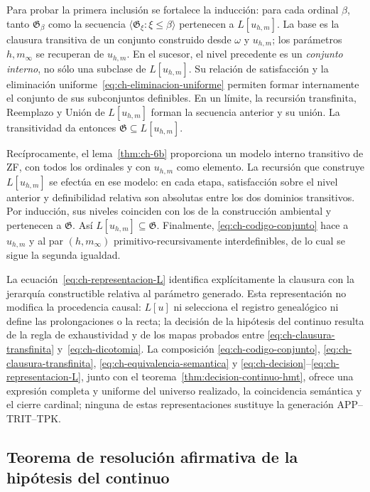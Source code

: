 Para probar la primera inclusión se fortalece la inducción: para cada
ordinal \(\beta\), tanto \(\mathfrak G_\beta\) como la secuencia
\(\langle\mathfrak G_\xi:\xi\leq\beta\rangle\) pertenecen a
\(L[u_{h,m}]\). La base es la clausura transitiva de un conjunto construido
desde \(\omega\) y \(u_{h,m}\); los parámetros \(h,m_\infty\) se recuperan
de \(u_{h,m}\). En el sucesor, el nivel precedente es un \emph{conjunto
interno}, no sólo una subclase de \(L[u_{h,m}]\). Su relación de satisfacción
y la eliminación uniforme~\eqref{eq:ch-eliminacion-uniforme} permiten formar internamente el conjunto de
sus subconjuntos definibles. En un límite, la recursión transfinita,
Reemplazo y Unión de \(L[u_{h,m}]\) forman la secuencia anterior y su unión.
La transitividad da entonces \(\mathfrak G\subseteq L[u_{h,m}]\).

Recíprocamente, el lema~\ref{thm:ch-6b} proporciona un modelo interno
transitivo de ZF, con todos los ordinales y con \(u_{h,m}\) como elemento.
La recursión que construye \(L[u_{h,m}]\) se efectúa en ese modelo: en cada
etapa, satisfacción sobre el nivel anterior y definibilidad relativa son
absolutas entre los dos dominios transitivos. Por inducción, sus niveles
coinciden con los de la construcción ambiental y pertenecen a
\(\mathfrak G\). Así \(L[u_{h,m}]\subseteq\mathfrak G\). Finalmente,
\eqref{eq:ch-codigo-conjunto} hace a \(u_{h,m}\) y al par \((h,m_\infty)\)
primitivo-recursivamente interdefinibles, de lo cual se sigue la segunda
igualdad.

La ecuación~\eqref{eq:ch-representacion-L} identifica explícitamente la
clausura con la jerarquía constructible relativa al parámetro generado. Esta
representación no modifica la procedencia causal: \(L[u]\) ni selecciona el
registro genealógico ni define las prolongaciones o la recta; la decisión de
la hipótesis del continuo resulta de la regla de exhaustividad y de los mapas probados entre
\eqref{eq:ch-clausura-transfinita} y~\eqref{eq:ch-dicotomia}. La composición
\eqref{eq:ch-codigo-conjunto}, \eqref{eq:ch-clausura-transfinita},
\eqref{eq:ch-equivalencia-semantica} y
\eqref{eq:ch-decision}--\eqref{eq:ch-representacion-L}, junto con el
teorema~\ref{thm:decision-continuo-hmt}, ofrece una expresión completa y
uniforme del universo realizado, la coincidencia semántica y el cierre
cardinal; ninguna de estas representaciones sustituye la generación
APP--TRIT--TPK.

\subsection{Teorema de resolución afirmativa de la hipótesis del continuo}


